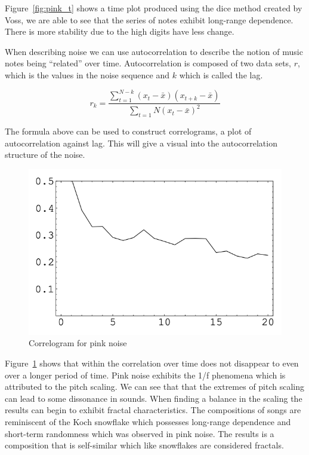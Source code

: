 \documentclass{article}
\begin{document}
Figure~\ref{fig:pink_t} shows a time plot produced using the dice method created
by Voss, we are able to see that the series of notes exhibit long-range
dependence. There is more stability due to the high digits have less change.

When describing noise we can use autocorrelation to describe the notion of music
notes being ``related'' over time. Autocorrelation is composed of two data sets,
$r$, which is the values in the noise sequence and $k$ which is called the lag.

\[
    r_k=\frac
    {\sum_{t=1}^{N-k} (x_t-\bar x)(x_{t+k}-\bar x)}
    {\sum_{t=1}{N}{(x_t-\bar x)}^2}
\]

The formula above can be used to construct correlograms, a plot of
autocorrelation against lag. This will give a visual into the autocorrelation
structure of the noise.

\begin{figure}[ht!]
    \centering
    \includegraphics[width=\linewidth]{figures/pink_noise_correlogram.png}
    \caption{%
        Correlogram for pink noise\cite{8}
    }\label{fig:pink_c}
\end{figure}

Figure~\ref{fig:pink_c} shows that within the correlation over time does
not disappear to even over a longer period of time. Pink noise exhibits the 1/f
phenomena which is attributed to the pitch scaling. We can see that that the
extremes of pitch scaling can lead to some dissonance in sounds. When finding a
balance in the scaling the results can begin to exhibit fractal characteristics.
The compositions of songs are reminiscent of the Koch snowflake which possesses
long-range dependence and short-term randomness which was observed in pink
noise. The results is a composition that is self-similar which like snowflakes
are considered fractals.
\end{document}
